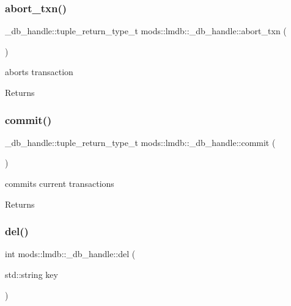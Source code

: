 \subsubsection{\texorpdfstring{abort\+\_\+txn()}{abort\_txn()}}
{\footnotesize\ttfamily \+\_\+db\+\_\+handle\+::tuple\+\_\+return\+\_\+type\+\_\+t mods\+::lmdb\+::\+\_\+db\+\_\+handle\+::abort\+\_\+txn (\begin{DoxyParamCaption}{ }\end{DoxyParamCaption})}



aborts transaction 

\begin{DoxyReturn}{Returns}

\end{DoxyReturn}
\mbox{\label{structmods_1_1lmdb_1_1__db__handle_accce5da22ddddad187ca266cab1740e7}} 
\subsubsection{\texorpdfstring{commit()}{commit()}}
{\footnotesize\ttfamily \+\_\+db\+\_\+handle\+::tuple\+\_\+return\+\_\+type\+\_\+t mods\+::lmdb\+::\+\_\+db\+\_\+handle\+::commit (\begin{DoxyParamCaption}{ }\end{DoxyParamCaption})}



commits current transactions 

\begin{DoxyReturn}{Returns}

\end{DoxyReturn}
\mbox{\label{structmods_1_1lmdb_1_1__db__handle_a099cccc7f73edc949771274ba8ecaa13}} 
\subsubsection{\texorpdfstring{del()}{del()}}
{\footnotesize\ttfamily int mods\+::lmdb\+::\+\_\+db\+\_\+handle\+::del (\begin{DoxyParamCaption}\item[{std\+::string}]{key }\end{DoxyParamCaption})}



